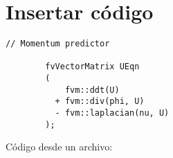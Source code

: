 % 
\addappheadtotoc %
\chapter{Insertar código}\label{c:codigo}

\begin{lstlisting}[style=myStyle,firstnumber=58]
        // Momentum predictor

        fvVectorMatrix UEqn
        (
            fvm::ddt(U)
          + fvm::div(phi, U)
          - fvm::laplacian(nu, U)
        );
\end{lstlisting}

Código desde un archivo: 



% 